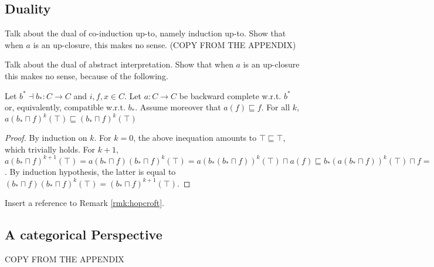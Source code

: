\documentclass{llncs}
\begin{document}
\subsection{Duality}

Talk about the dual of co-induction up-to, namely induction up-to. Show that when $a$ is an up-closure, this makes no sense. (COPY FROM THE APPENDIX)

Talk about the dual of abstract interpretation. Show that when $a$ is an up-closure this makes no sense, because of the following.
%
\begin{proposition}
Let $b^* \dashv b_* \colon C \to C$ and $i,f,x\in C$. Let $a\colon C\to C$ be backward complete w.r.t. $b^*$ or, equivalently, compatible w.r.t. $b_*$. Assume moreover that $a(f)\sqsubseteq f$. For all $k$, $a(b_*\sqcap f)^k(\top) \sqsubseteq (b_*\sqcap f)^k(\top)$
\end{proposition}
\begin{proof}
By induction on $k$. For $k=0$, the above inequation amounts to  $\top \sqsubseteq \top$, which trivially holds.
For $k+1$, $a(b_*\sqcap f)^{k+1}(\top)=a(b_*\sqcap f)(b_*\sqcap f)^k(\top) = a(b_*(b_*\sqcap f))^k(\top) \sqcap a(f) \sqsubseteq b_*(a(b_*\sqcap f))^k(\top) \sqcap f = (b_*\sqcap f)(a(b_*\sqcap f))^k(\top)$. By induction hypothesis, the latter is equal to $(b_*\sqcap f)(b_*\sqcap f)^k(\top)=(b_*\sqcap f)^{k+1}(\top)$.
\end{proof}

Insert a reference to Remark \ref{rmk:hopcroft}.

\subsection{A categorical Perspective}
COPY FROM THE APPENDIX
\end{document}
